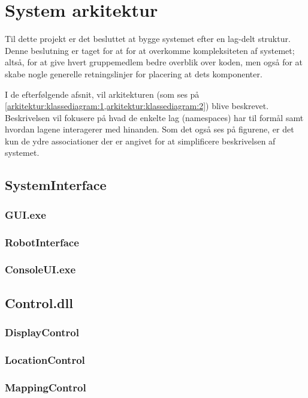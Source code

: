 \section{System arkitektur}\label{arkitektur}
Til dette projekt er det besluttet at bygge systemet efter en lag-delt struktur.
Denne beslutning er taget for at for at overkomme kompleksiteten af systemet; altså, for at give hvert gruppemedlem bedre overblik over koden, men også for at skabe nogle generelle retningslinjer for placering at dets komponenter.

I de efterfølgende afsnit, vil arkitekturen (som ses på  \cref{arkitektur:klassediagram:1,arkitektur:klassediagram:2}) blive beskrevet.
Beskrivelsen vil fokusere på hvad de enkelte lag (namespaces) har til formål samt hvordan lagene interagerer med hinanden.
Som det også ses på figurene, er det kun de ydre associationer der er angivet for at simplificere beskrivelsen af systemet.

\subsection{SystemInterface}\label{arkitektur:systeminterface}
\subsubsection{GUI.exe}
\subsubsection{RobotInterface}
\subsubsection{ConsoleUI.exe}

\subsection{Control.dll}\label{arkitektur:control}
\subsubsection{DisplayControl}
\subsubsection{LocationControl}
\subsubsection{MappingControl}


